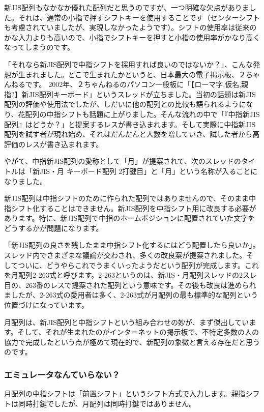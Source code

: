 新JIS配列もなかなか優れた配列だと思うのですが、一つ明確な欠点がありました。それは、通常の小指で押すシフトキーを使用することです（センターシフトも考慮されていましたが、実現しなかったようです）。シフトの使用率は従来のかな入力よりも高いので、小指でシフトキーを押すと小指の使用率がかなり高くなってしまうのです。

「それなら新JIS配列で中指シフトを採用すれば良いのではないか？」、こんな発想が生まれました。どこで生まれたかというと、日本最大の電子掲示板、２ちゃんねるです。
2002年、２ちゃんねるのパソコン一般板に「【ローマ字,仮名,親指?】新JIS配列キーボード」というスレッドが立ちました。当初の話題は新JIS配列の評価や使用法でしたが、しだいに他の配列との比較も語られるようになり、花配列の中指シフトも話題に上がりました。そんな流れの中で「『中指新JIS配列』はどうか？」と提案するレスが書き込まれます。そして実際に中指新JIS配列を試す者が現れ始め、それはだんだんと人数を増していき、試した者から高評価のレスが書き込まれます。

やがて、中指新JIS配列の愛称として「月」が提案されて、次のスレッドのタイトルは「新JIS・月 キーボード配列 2打鍵目」と「月」という名称が入ることになりました。

新JIS配列は中指シフトのために作られた配列ではありませんので、そのまま中指シフト化することはできません。新JIS配列を中指シフト用に改良する必要があります。特に、新JIS配列で中指のホームポジションに配置されていた文字をどうするかが問題になります。

「新JIS配列の良さを残したまま中指シフト化するにはどう配置したら良いか」。スレッド内でさまざまな議論が交わされ、多くの改良案が提案されました。そしてついに、どうやらこれでうまくいったようだという配列が完成します。これを月配列2-263式と呼びます。2-263というのは、新JIS・月配列スレッドの2スレ目の、263番のレスで提案された配列という意味です。その後も改良は進められましたが、2-263式の愛用者は多く、2-263式が月配列の最も標準的な配列という位置づけになっています。

月配列は、新JIS配列と中指シフトという組み合わせの妙が、まず傑出しています。そして、それが生まれたのがインターネットの掲示板で、不特定多数の人の協力で完成したという点が極めて現在的で、新配列の象徴と言える存在だと思うのです。

\subsubsection*{エミュレータなんていらない？}

月配列の中指シフトは「前置シフト」というシフト方式で入力します。親指シフトは同時打鍵でしたが、月配列は同時打鍵ではありません。

